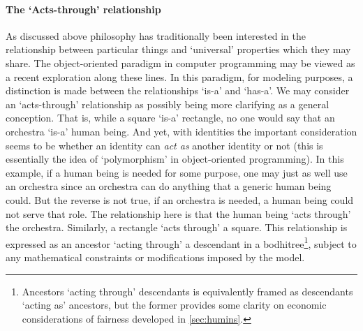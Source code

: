 \documentclass[pra,twocolumn,groupedaddress,10pt]{revtex4}
\theoremstyle{definition}
\begin{document}
\paragraph{The `Acts-through' relationship} As discussed above philosophy has traditionally been interested in the relationship between particular things and `universal' properties which they may share. The object-oriented paradigm in computer programming may be viewed as a recent exploration along these lines. In this paradigm, for modeling purposes, a distinction is made between the relationships `is-a' and `has-a'. We may consider an `acts-through' relationship as possibly being more clarifying as a general conception. That is, while a square `is-a' rectangle, no one would say that an orchestra `is-a' human being. And yet, with identities the important consideration seems to be whether an identity can \emph{act as} another identity or not (this is essentially the idea of `polymorphism' in object-oriented programming). In this example, if a human being is needed for some purpose, one may just as well use an orchestra since an orchestra can do anything that a generic human being could. But the reverse is not true, if an orchestra is needed, a human being could not serve that role. The relationship here is that the human being `acts through' the orchestra. Similarly, a rectangle `acts through' a square. This relationship is expressed as an ancestor `acting through' a descendant in a bodhitree\footnote{Ancestors `acting through' descendants is equivalently framed as descendants `acting as' ancestors, but the former provides some clarity on economic considerations of fairness developed in \autoref{sec:humins}.}, subject to any mathematical constraints or modifications imposed by the model.
\end{document}

